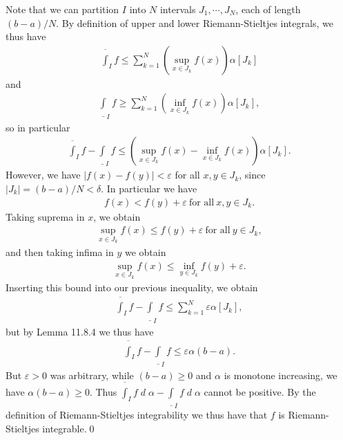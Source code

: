 \documentclass{book}
\DeclareMathOperator{\dd}{\mathit{d}}
\begin{document}
Note that we can partition $I$ into $N$ intervals $J_1, \cdots , J_N$, each of length $(b − a)/N$. By definition of upper and lower Riemann-Stieltjes integrals, we thus have
    \begin{align*}
        \overline\int_{I} f
        \leq \sum_{k = 1}^{N} \left(\sup_{x \in J_k} f(x)\right)\alpha[J_k]
    \end{align*}
and
    \begin{align*}
        \underline\int_{I} f
        \geq \sum_{k = 1}^{N} \left(\inf_{x \in J_k} f(x)\right)\alpha[J_k],
    \end{align*}
so in particular
    \begin{align*}
        \overline\int_{I} f - \underline\int_{I} f \leq \left(\sup_{x \in J_k} f(x) - \inf_{x \in J_k} f(x)\right)\alpha[J_k].
    \end{align*}
However, we have $|f(x) - f(y)| < \varepsilon$ for all $x, y \in J_k$, since $|J_k| = (b - a)/N < \delta$. In particular we have
    \begin{align*}
        f(x) < f(y) + \varepsilon\ \text{for all}\ x, y \in J_k.
    \end{align*}
Taking suprema in $x$, we obtain
    \begin{align*}
        \sup_{x \in J_k} f(x) \leq f(y) + \varepsilon\ \text{for all}\ y \in J_k,
    \end{align*}
and then taking infima in $y$ we obtain
    \begin{align*}
        \sup_{x \in J_k} f(x) \leq \inf_{y \in J_k} f(y) + \varepsilon.
    \end{align*}
Inserting this bound into our previous inequality, we obtain
    \begin{align*}
        \overline\int_{I} f - \underline\int_{I} f \leq \sum_{k = 1}^{N} \varepsilon\alpha[J_k],
    \end{align*}
but by Lemma 11.8.4 we thus have
    \begin{align*}
        \overline\int_{I} f - \underline\int_{I} f \leq \varepsilon \alpha(b - a).
    \end{align*}
But $\varepsilon > 0$ was arbitrary, while $(b−a) \geq 0$ and $\alpha$ is monotone increasing, we have $\alpha(b - a) \geq 0$. Thus $\overline\int_{I} f \dd\alpha - \underline\int_{I} f \dd\alpha$ cannot be positive. By the definition of Riemann-Stieltjes integrability we thus have that $f$ is Riemann-Stieltjes integrable.\qed
\end{document}
